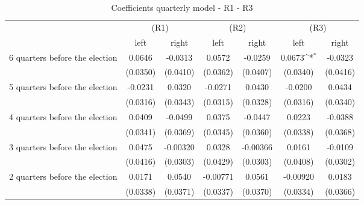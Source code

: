 \begin{table}[!ht]\centering \scriptsize
\def\sym#1{\ifmmode^{#1}\else\(^{#1}\)\fi}
\caption{Coefficients quarterly model - R1 - R3}
\begin{tabular}{l*{6}{c}}
\hline\hline
                    &\multicolumn{2}{c}{(R1)}&\multicolumn{2}{c}{(R2)}&\multicolumn{2}{c}{(R3)}\\
&\multicolumn{1}{c}{left}&\multicolumn{1}{c}{right}&\multicolumn{1}{c}{left}&\multicolumn{1}{c}{right}&\multicolumn{1}{c}{left}&\multicolumn{1}{c}{right}\\
\hline
 6 quarters before the election&      0.0646         &     -0.0313         &      0.0572         &     -0.0259         &      0.0673\sym{*}  &     -0.0323         \\
                    &    (0.0350)         &    (0.0410)         &    (0.0362)         &    (0.0407)         &    (0.0340)         &    (0.0416)         \\
[0,12em]
 5 quarters before the election&     -0.0231         &      0.0320         &     -0.0271         &      0.0430         &     -0.0200         &      0.0434         \\
                    &    (0.0316)         &    (0.0343)         &    (0.0315)         &    (0.0328)         &    (0.0316)         &    (0.0340)         \\
[0,12em]
 4 quarters before the election&      0.0409         &     -0.0499         &      0.0375         &     -0.0447         &      0.0223         &     -0.0388         \\
                    &    (0.0341)         &    (0.0369)         &    (0.0345)         &    (0.0360)         &    (0.0338)         &    (0.0368)         \\
[0,12em]
 3 quarters before the election&      0.0475         &    -0.00320         &      0.0328         &    -0.00366         &      0.0161         &     -0.0109         \\
                    &    (0.0416)         &    (0.0303)         &    (0.0429)         &    (0.0303)         &    (0.0408)         &    (0.0302)         \\
[0,12em]
 2 quarters before the election&      0.0171         &      0.0540         &    -0.00771         &      0.0561         &    -0.00920         &      0.0183         \\
                    &    (0.0338)         &    (0.0371)         &    (0.0337)         &    (0.0370)         &    (0.0334)         &    (0.0366)         \\

\end{tabular}
\end{table}

